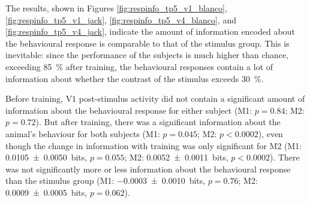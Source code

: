 %


The results, shown in Figures \ref{fig:respinfo_tp5_v1_blanco}, \ref{fig:respinfo_tp5_v1_jack}, \ref{fig:respinfo_tp5_v4_blanco}, and \ref{fig:respinfo_tp5_v4_jack}, indicate the amount of information encoded about the behavioural response is comparable to that of the stimulus group.
This is inevitable: since the performance of the subjects is much higher than chance, exceeding \SI{85}{\percent} after training, the behavioural responses contain a lot of information about whether the contrast of the stimulus exceeds \SI{30}{\percent}.


Before training, \ac{V1} post-stimulus activity did not contain a significant amount of information about the behavioural response for either subject (\ac{M1}: $p=0.84$; \ac{M2}: $p=0.72$).
But after training, there was a significant information about the animal's behaviour for both subjects (\ac{M1}: $p=0.045$; \ac{M2}: $p < 0.0002$), even though the change in information with training was only significant for \ac{M2} (\ac{M1}: \SI{+0.0105\pm0.0050}{bits}, $p=0.055$; \ac{M2}: \SI{+0.0052\pm0.0011}{bits}, $p < 0.0002$).
There was not significantly more or less information about the behavioural response than the stimulus group (\ac{M1}: \SI{-0.0003\pm0.0010}{bits}, $p=0.76$; \ac{M2}: \SI{+0.0009\pm0.0005}{bits}, $p=0.062$).

